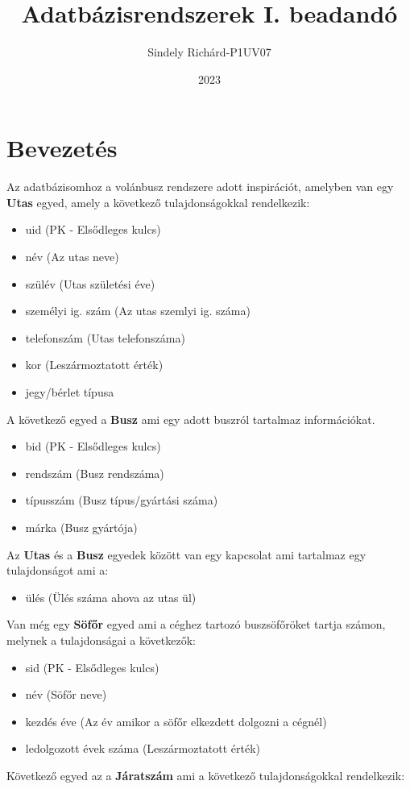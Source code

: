 \documentclass[12pt]{article}
\author{Sindely Richárd-P1UV07}
\title{Adatbázisrendszerek I. beadandó}
\date{2023}
\begin{document}
\maketitle
\newpage
\tableofcontents
\newpage
\section{Bevezetés}
\label{bev}
Az adatbázisomhoz a volánbusz rendszere adott inspirációt, amelyben van egy \textbf{Utas} egyed, amely a következő tulajdonságokkal rendelkezik:
\begin{itemize}
\item uid (PK - Elsődleges kulcs)
\item név (Az utas neve)
\item szülév (Utas születési éve)
\item személyi ig. szám (Az utas szemlyi ig. száma)
\item telefonszám (Utas telefonszáma)
\item kor (Leszármoztatott érték)
\item jegy/bérlet típusa
\end{itemize}
A következő egyed a \textbf{Busz} ami egy adott buszról tartalmaz információkat.
\begin{itemize}
\item bid (PK - Elsődleges kulcs)
\item rendszám (Busz rendszáma)
\item típusszám (Busz típus/gyártási száma)
\item márka (Busz gyártója)
\end{itemize}
Az \textbf{Utas} és a \textbf{Busz} egyedek között van egy kapcsolat ami tartalmaz egy tulajdonságot ami a:
\begin{itemize}
\item ülés (Ülés száma ahova az utas ül)
\end{itemize}
Van még egy \textbf{Söfőr} egyed ami a céghez tartozó buszsöfőröket tartja számon, melynek a tulajdonságai a következők:
\begin{itemize}
\item sid (PK - Elsődleges kulcs)
\item név (Söfőr neve)
\item kezdés éve (Az év amikor a söfőr elkezdett dolgozni a cégnél)
\item ledolgozott évek száma (Leszármoztatott érték)
\end{itemize}
Következő egyed az a \textbf{Járatszám} ami a következő tulajdonságokkal rendelkezik:
\end{document}
